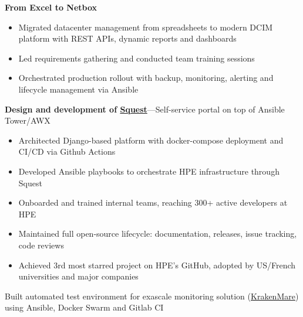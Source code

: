 \medskip
\divider%
\medskip


\textbf{From Excel to Netbox}
\begin{itemize}
\item Migrated datacenter management from spreadsheets to modern DCIM platform with REST APIs, dynamic reports and dashboards
\item Led requirements gathering and conducted team training sessions
\item Orchestrated production rollout with backup, monitoring, alerting and lifecycle management via Ansible
\end{itemize}

\textbf{Design and development of \faGithub\href{https://github.com/HewlettPackard/squest}{Squest}}---Self-service portal on top of Ansible Tower/AWX
\begin{itemize}
\item Architected Django-based platform with docker-compose deployment and CI/CD via Github Actions
\item Developed Ansible playbooks to orchestrate HPE infrastructure through Squest
\item Onboarded and trained internal teams, reaching 300+ active developers at HPE
\item Maintained full open-source lifecycle: documentation, releases, issue tracking, code reviews
\item Achieved 3rd most starred project on HPE's GitHub, adopted by US/French universities and major companies
\end{itemize}

\medskip
\divider%
\medskip


Built automated test environment for exascale monitoring solution (\faGithub\href{https://github.com/HewlettPackard/KrakenMare}{KrakenMare}) using Ansible, Docker Swarm and Gitlab CI
